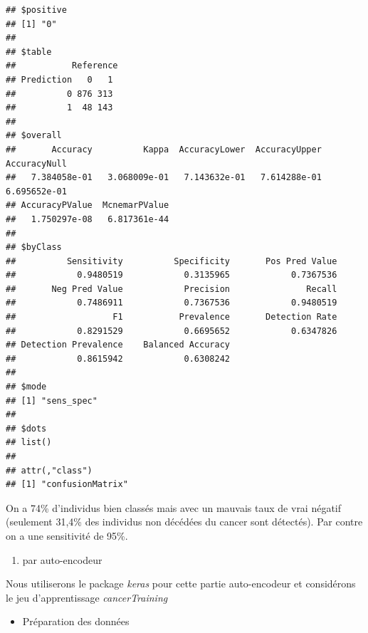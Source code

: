 \documentclass[
  12pt,
]{article}
\providecommand{\tightlist}{%
  \setlength{\itemsep}{0pt}\setlength{\parskip}{0pt}}
\begin{document}
\begin{verbatim}
## $positive
## [1] "0"
## 
## $table
##           Reference
## Prediction   0   1
##          0 876 313
##          1  48 143
## 
## $overall
##       Accuracy          Kappa  AccuracyLower  AccuracyUpper   AccuracyNull 
##   7.384058e-01   3.068009e-01   7.143632e-01   7.614288e-01   6.695652e-01 
## AccuracyPValue  McnemarPValue 
##   1.750297e-08   6.817361e-44 
## 
## $byClass
##          Sensitivity          Specificity       Pos Pred Value 
##            0.9480519            0.3135965            0.7367536 
##       Neg Pred Value            Precision               Recall 
##            0.7486911            0.7367536            0.9480519 
##                   F1           Prevalence       Detection Rate 
##            0.8291529            0.6695652            0.6347826 
## Detection Prevalence    Balanced Accuracy 
##            0.8615942            0.6308242 
## 
## $mode
## [1] "sens_spec"
## 
## $dots
## list()
## 
## attr(,"class")
## [1] "confusionMatrix"
\end{verbatim}

On a 74\% d'individus bien classés mais avec un mauvais taux de vrai
négatif (seulement 31,4\% des individus non décédées du cancer sont
détectés). Par contre on a une sensitivité de 95\%.

\newpage

\begin{enumerate}
\def\labelenumi{\alph{enumi}.}
\setcounter{enumi}{2}
\tightlist
\item
  par auto-encodeur
\end{enumerate}

Nous utiliserons le package \emph{keras} pour cette partie auto-encodeur
et considérons le jeu d'apprentissage \emph{cancerTraining}

\begin{itemize}
\tightlist
\item
  Préparation des données
\end{itemize}
\end{document}
